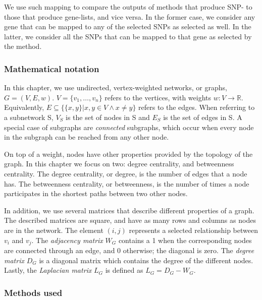 \documentclass[
  11pt,
]{env/yjiao}
\begin{document}
We use such mapping to compare the outputs of methods that produce SNP-
to those that produce gene-lists, and vice versa. In the former case, we
consider any gene that can be mapped to any of the selected SNPs as
selected as well. In the latter, we consider all the SNPs that can be
mapped to that gene as selected by the method.

\hypertarget{methods:notation}{%
\subsubsection{Mathematical notation}\label{methods:notation}}

In this chapter, we use undirected, vertex-weighted networks, or graphs,
\(G = (V,E,w)\). \(V = \{v_{1}, \dots{}, v_{n}\}\) refers to the vertices,
with weights \(w: V \rightarrow \mathbb{R}\). Equivalently,
\(E \subseteq \{\{x,y\} | x,y \in V \wedge x \neq y\}\) refers to the
edges. When referring to a subnetwork S, \(V_{S}\) is the set of nodes in
S and \(E_{S}\) is the set of edges in S. A special case of subgraphs are
\emph{connected} subgraphs, which occur when every node in the subgraph can
be reached from any other node.

On top of a weight, nodes have other properties provided by the topology
of the graph. In this chapter we focus on two: degree centrality, and
betweenness centrality. The degree centrality, or degree, is the number
of edges that a node has. The betweenness centrality, or betweenness, is
the number of times a node participates in the shortest paths between
two other nodes.

In addition, we use several matrices that describe different properties
of a graph. The described matrices are square, and have as many rows and
columns as nodes are in the network. The element \((i,j)\) represents a
selected relationship between \(v_i\) and \(v_j\). The \emph{adjacency matrix}
\(W_G\) contains a 1 when the corresponding nodes are connected through an
edge, and 0 otherwise; the diagonal is zero. The \emph{degree matrix} \(D_G\)
is a diagonal matrix which contains the degree of the different nodes.
Lastly, the \emph{Laplacian matrix} \(L_G\) is defined as \(L_G = D_G - W_G\).

\hypertarget{methods:methods}{%
\subsubsection{Methods used}\label{methods:methods}}
\end{document}
